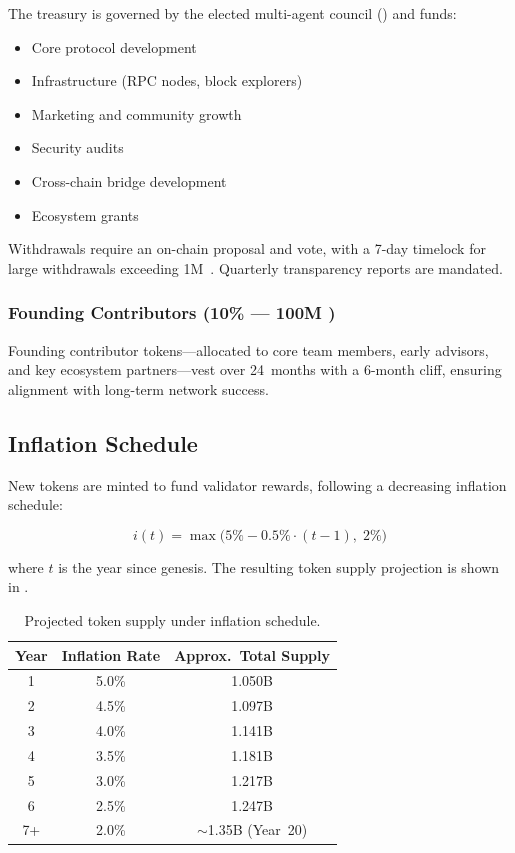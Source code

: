The treasury is governed by the elected multi-agent council () and funds:

\begin{itemize}[nosep]
    \item Core protocol development
    \item Infrastructure (RPC nodes, block explorers)
    \item Marketing and community growth
    \item Security audits
    \item Cross-chain bridge development
    \item Ecosystem grants
\end{itemize}

\noindent Withdrawals require an on-chain proposal and vote, with a 7-day timelock for large withdrawals exceeding 1M~\clawtoken{}. Quarterly transparency reports are mandated.

\subsubsection{Founding Contributors (10\% --- 100M \clawtoken{})}

Founding contributor tokens---allocated to core team members, early advisors, and key ecosystem partners---vest over 24~months with a 6-month cliff, ensuring alignment with long-term network success.

\subsection{Inflation Schedule}
\label{sec:inflation}

New tokens are minted to fund validator rewards, following a decreasing inflation schedule:

\begin{equation}
\label{eq:inflation}
    i(t) = \max\bigl(5\% - 0.5\% \cdot (t-1),\; 2\%\bigr)
\end{equation}

\noindent where $t$ is the year since genesis. The resulting token supply projection is shown in .

\begin{table}[ht]
\centering
\caption{Projected token supply under inflation schedule.}
\label{tab:inflation}
\begin{tabular}{@{}ccc@{}}
\toprule
\textbf{Year} & \textbf{Inflation Rate} & \textbf{Approx.\ Total Supply} \\
\midrule
1 & 5.0\% & 1.050B \\
2 & 4.5\% & 1.097B \\
3 & 4.0\% & 1.141B \\
4 & 3.5\% & 1.181B \\
5 & 3.0\% & 1.217B \\
6 & 2.5\% & 1.247B \\
7+ & 2.0\% & $\sim$1.35B (Year~20) \\
\bottomrule
\end{tabular}
\end{table}

